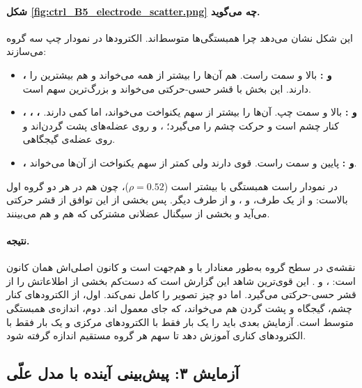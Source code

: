 \paragraph{شکل \ref{fig:ctrl_B5_electrode_scatter.png} چه می‌گوید.} این شکل نشان می‌دهد چرا همبستگی‌ها متوسط‌اند. الکترودها در نمودار چپ سه گروه می‌سازند:
\begin{itemize}
\item \textbf{،  و :} بالا و سمت راست. هم  آن‌ها را بیشتر از همه می‌خواند و هم بیشترین  را دارند. این بخش با قشر حسی-حرکتی می‌خواند و بزرگ‌ترین سهم  است.
\item \textbf{، ، ،  و :} بالا و سمت چپ.  آن‌ها را بیشتر از سهم یکنواخت می‌خواند، اما  کمی دارند.  کنار چشم است و حرکت چشم را می‌گیرد؛ ،  و  روی عضله‌های پشت گردن‌اند و  روی عضله‌ی گیجگاهی.
\item \textbf{،  و :} پایین و سمت راست.  قوی دارند ولی  کمتر از سهم یکنواخت از آن‌ها می‌خواند.
\end{itemize}
در نمودار راست همبستگی با  بیشتر است ($\rho=0.52$)، چون  هم در هر دو گروه اول بالاست:  و  از یک طرف، و ،  و  از طرف دیگر. پس بخشی از این توافق از قشر حرکتی می‌آید و بخشی از سیگنال عضلانی مشترکی که هم  و هم  می‌بینند.

\paragraph{نتیجه.} نقشه‌ی  در سطح گروه به‌طور معنادار با  و  هم‌جهت است و کانون اصلی‌اش همان کانون  است: ،  و . این قوی‌ترین شاهد این گزارش است که  دست‌کم بخشی از اطلاعاتش را از قشر حسی-حرکتی می‌گیرد. اما دو چیز تصویر را کامل نمی‌کند. اول،  از الکترودهای کنار چشم، گیجگاه و پشت گردن هم می‌خواند، که جای معمول اند. دوم، اندازه‌ی همبستگی متوسط است. آزمایش بعدی باید  را یک بار فقط با الکترودهای مرکزی و یک بار فقط با الکترودهای کناری آموزش دهد تا سهم هر گروه مستقیم اندازه گرفته شود.

\FloatBarrier
\subsection{آزمایش ۳: پیش‌بینی آینده با مدل علّی}
\label{sec:controls-horizon}

